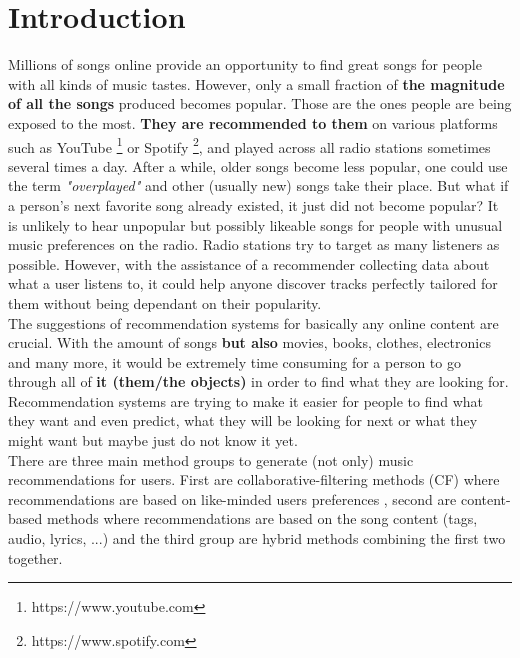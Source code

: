 \chapter{Introduction}
Millions of songs online provide an opportunity to find great songs for people with all kinds of music tastes. However, only a small fraction of {\bf the magnitude of all the songs} produced becomes popular. Those are the ones people are being exposed to the most. {\bf They are recommended to them} on various platforms such as YouTube \footnote{https://www.youtube.com} or Spotify \footnote{https://www.spotify.com}, and played across all radio stations sometimes several times a day. After a while, older songs become less popular, one could use the term \textit{"overplayed"} and other (usually new) songs take their place. But what if a person's next favorite song already existed, it just did not become popular? It is unlikely to hear unpopular but possibly likeable songs for people with unusual music preferences on the radio. Radio stations try to target as many listeners as possible. However, with the assistance of a recommender collecting data about what a user listens to, it could help anyone discover tracks perfectly tailored for them without being dependant on their popularity.\\
The suggestions of recommendation systems for basically any online content are crucial. With the amount of songs {\bf but also} movies, books, clothes, electronics and many more, it would be extremely time consuming for a person to go through all of {\bf it (them/the objects)} in order to find what they are looking for. Recommendation systems are trying to make it easier for people to find what they want and even predict, what they will be looking for next or what they might want but maybe just do not know it yet. \\
There are three main method groups to generate (not only) music recommendations for users. First are collaborative-filtering methods (CF) where recommendations are based on like-minded users preferences , second are content-based methods where recommendations are based on the song content (tags, audio, lyrics, ...) and the third group are hybrid methods combining the first two together. \\
